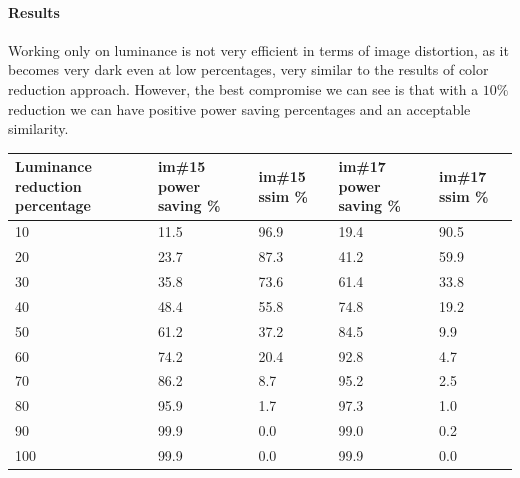 \documentclass[a4paper]{article}
\begin{document}
        \paragraph{Results}
        Working only on luminance is not very efficient in terms of image distortion, as it becomes very dark even at low percentages, very similar to the results of color reduction approach. However, the best compromise we can see is that with a $10\%$ reduction we can have positive power saving percentages and an acceptable similarity.


        \begin{center}
\begin{tabular}{@{}lllll@{}}
\toprule
{\color[HTML]{000000} Luminance reduction percentage} & im\#15 power saving  \% & im\#15 ssim \%            & im\#17 power saving \% & im\#17 ssim \% \\ \midrule
10                                                    & 11.5                    & 96.9 & 19.4                   & 90.5           \\
20                                                    & 23.7                    & 87.3                      & 41.2                   & 59.9           \\
30                                                    & 35.8                    & 73.6                      & 61.4                   & 33.8           \\
40                                                    & 48.4                    & 55.8                      & 74.8                   & 19.2           \\
50                                                    & 61.2                    & 37.2                      & 84.5                   & 9.9            \\
60                                                    & 74.2                    & 20.4                      & 92.8                   & 4.7            \\
70                                                    & 86.2                    & 8.7                       & 95.2                   & 2.5            \\
80                                                    & 95.9                    & 1.7                       & 97.3                   & 1.0            \\
90                                                    & 99.9                    & 0.0                       & 99.0                   & 0.2            \\
100                                                   & 99.9                    & 0.0                       & 99.9                   & 0.0            \\ \bottomrule
\end{tabular}
\end{center}
\end{document}
